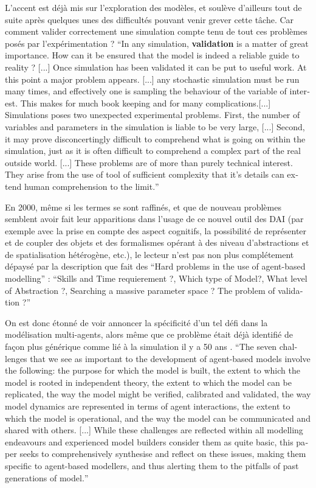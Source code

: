 L'accent est déjà mis sur l'exploration des modèles, et \textcite[301]{Doran1975} soulève d'ailleurs tout de suite après quelques unes des difficultés pouvant venir grever cette tâche. Car comment valider correctement une simulation compte tenu de tout ces problèmes posés par l'expérimentation ? \foreignquote{english}{In any simulation, \textbf{validation} is a matter of great importance. How can it be ensured that the model is indeed a reliable guide to reality ? [...] Once simulation has been validated it can be put to useful work. At this point a major problem appears. [...] any stochastic simulation must be run many times, and effectively one is sampling the behaviour of the variable of interest. This makes for much book keeping and for many complications.[...] Simulations poses two unexpected experimental problems. First, the number of variables and parameters in the simulation is liable to be very large, [...] Second, it may prove disconcertingly difficult to comprehend what is going on within the simulation, just as it is often difficult to comprehend a complex part of the real outside world. [...] These problems are of more than purely technical interest. They arise from the use of tool of sufficient complexity that it's details can extend human comprehension to the limit.}

En 2000, même si les termes se sont raffinés, et que de nouveau problèmes semblent avoir fait leur apparitions dans l'usage de ce nouvel outil des DAI (par exemple avec la prise en compte des aspect cognitifs, la possibilité de représenter et de coupler des objets et des formalismes opérant à des niveau d'abstractions et de spatialisation hétérogène, etc.), le lecteur n'est pas non plus complétement dépaysé par la description que fait \textcite{Doran2000} des \foreignquote{english}{Hard problems in the use of agent-based modelling} : \foreignquote{english}{Skills and Time requierement ?, Which type of Model?, What level of Abstraction ?, Searching a massive parameter space ? The problem of validation ?}

On est donc étonné de voir \textcites[93-94]{Crooks2012}{Crooks2008} annoncer la spécificité d'un tel défi dans la modélisation multi-agents, alors même que ce problème était déjà identifié de façon plus générique comme lié à la simulation il y a 50 ans \autocites{Naylor1967, Hermann1967}. \foreignquote{english}{The seven challenges that we see as important to the development of agent-based models involve the following: the purpose for which the model is built, the extent to which the model is rooted in independent theory, the extent to which the model can be replicated, the way the model might be verified, calibrated and validated, the way model dynamics are represented in terms of agent interactions, the extent to which the model is operational, and the way the model can be communicated and shared with others. [...] While these challenges are reflected within all modelling endeavours and experienced model builders consider them as quite basic, this paper seeks to comprehensively synthesise and reflect on these issues, making them specific to agent-based modellers, and thus alerting them to the pitfalls of past generations of model.}

